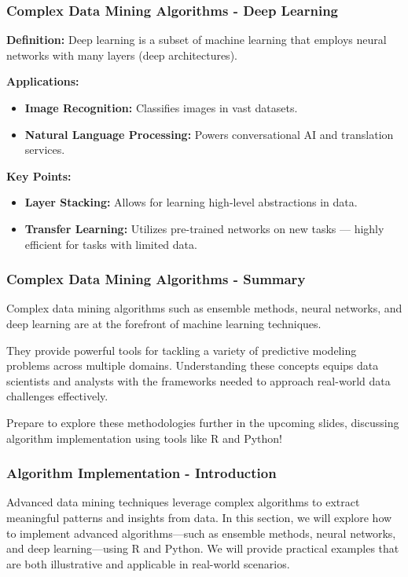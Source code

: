 \documentclass{beamer}
\begin{document}
\begin{frame}[fragile]
    \frametitle{Complex Data Mining Algorithms - Deep Learning}
    \textbf{Definition:} Deep learning is a subset of machine learning that employs neural networks with many layers (deep architectures).

    \textbf{Applications:}
    \begin{itemize}
        \item \textbf{Image Recognition:} Classifies images in vast datasets.
        \item \textbf{Natural Language Processing:} Powers conversational AI and translation services.
    \end{itemize}

    \textbf{Key Points:}
    \begin{itemize}
        \item \textbf{Layer Stacking:} Allows for learning high-level abstractions in data.
        \item \textbf{Transfer Learning:} Utilizes pre-trained networks on new tasks — highly efficient for tasks with limited data.
    \end{itemize}
\end{frame}

\begin{frame}[fragile]
    \frametitle{Complex Data Mining Algorithms - Summary}
    Complex data mining algorithms such as ensemble methods, neural networks, and deep learning are at the forefront of machine learning techniques.

    They provide powerful tools for tackling a variety of predictive modeling problems across multiple domains. 
    Understanding these concepts equips data scientists and analysts with the frameworks needed to approach real-world data challenges effectively.

    Prepare to explore these methodologies further in the upcoming slides, discussing algorithm implementation using tools like R and Python!
\end{frame}

\begin{frame}[fragile]
    \frametitle{Algorithm Implementation - Introduction}
    Advanced data mining techniques leverage complex algorithms to extract meaningful patterns and insights from data. In this section, we will explore how to implement advanced algorithms—such as ensemble methods, neural networks, and deep learning—using R and Python. We will provide practical examples that are both illustrative and applicable in real-world scenarios.
\end{frame}
\end{document}
